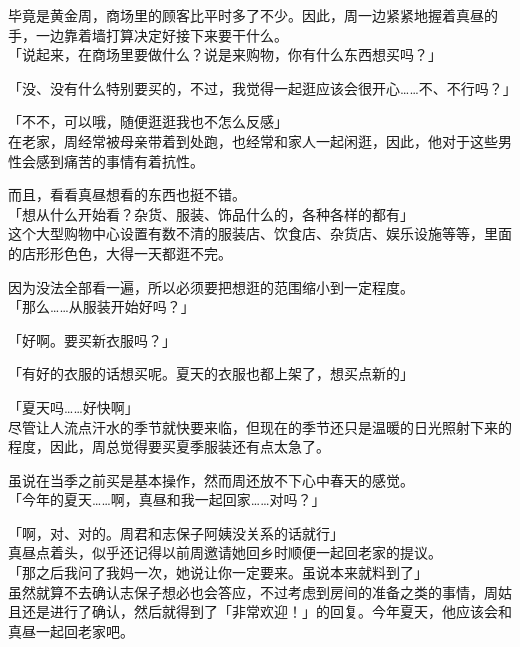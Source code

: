 毕竟是黄金周，商场里的顾客比平时多了不少。因此，周一边紧紧地握着真昼的手，一边靠着墙打算决定好接下来要干什么。\\

「说起来，在商场里要做什么？说是来购物，你有什么东西想买吗？」

「没、没有什么特别要买的，不过，我觉得一起逛应该会很开心……不、不行吗？」

「不不，可以哦，随便逛逛我也不怎么反感」\\

在老家，周经常被母亲带着到处跑，也经常和家人一起闲逛，因此，他对于这些男性会感到痛苦的事情有着抗性。

而且，看看真昼想看的东西也挺不错。\\

「想从什么开始看？杂货、服装、饰品什么的，各种各样的都有」\\

这个大型购物中心设置有数不清的服装店、饮食店、杂货店、娱乐设施等等，里面的店形形色色，大得一天都逛不完。

因为没法全部看一遍，所以必须要把想逛的范围缩小到一定程度。\\

「那么……从服装开始好吗？」

「好啊。要买新衣服吗？」

「有好的衣服的话想买呢。夏天的衣服也都上架了，想买点新的」

「夏天吗……好快啊」\\

尽管让人流点汗水的季节就快要来临，但现在的季节还只是温暖的日光照射下来的程度，因此，周总觉得要买夏季服装还有点太急了。

虽说在当季之前买是基本操作，然而周还放不下心中春天的感觉。\\

「今年的夏天……啊，真昼和我一起回家……对吗？」

「啊，对、对的。周君和志保子阿姨没关系的话就行」\\

真昼点着头，似乎还记得以前周邀请她回乡时顺便一起回老家的提议。\\

「那之后我问了我妈一次，她说让你一定要来。虽说本来就料到了」\\

虽然就算不去确认志保子想必也会答应，不过考虑到房间的准备之类的事情，周姑且还是进行了确认，然后就得到了「非常欢迎！」的回复。今年夏天，他应该会和真昼一起回老家吧。\\

